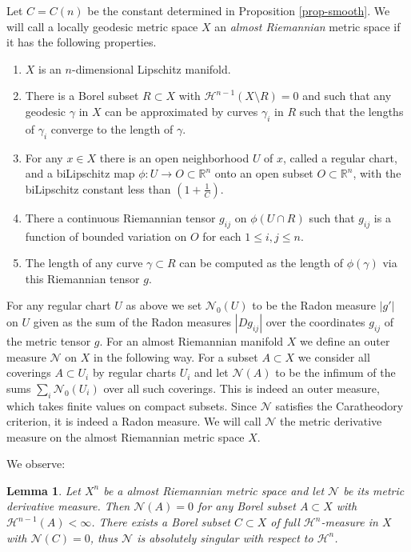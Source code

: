\documentclass[12pt,leqno]{amsart}
\numberwithin{equation}{section}
\newtheorem{lem}[thm]{Lemma}
\theoremstyle{definition}
\theoremstyle{remark}
\newcommand{\R}{\mathbb{R}}
\begin{document}
 Let  $C =C(n)$ be the constant determined in  Proposition \ref{prop-smooth}. We will call  a locally geodesic metric space
 $X$ an \emph{almost Riemannian} metric space  if it has the following properties.
 \begin{enumerate}
 \item  $X$ is an $n$-dimensional Lipschitz manifold.
 \item  There is   a Borel subset $R\subset X$ with $\mathcal H^{n-1} (X\setminus R)=0$ and such that  any geodesic
 $\gamma$ in $X$ can be approximated by curves $\gamma _i$ in $R$ such that the lengths of $\gamma _i$ converge to the length of  $\gamma$.
\item For any  $x\in X$ there is an  open neighborhood $U$ of $x$, called a regular chart, and  a biLipschitz map
$\phi:U\to O\subset \R^n$ onto an open subset $O\subset \R^n$, with the biLipschitz constant less than $(1+\frac 1 C)$.
 \item There a continuous Riemannian tensor $g_{ij} $ on $\phi (U\cap R)$ such that $g_{ij}$ is a  function of bounded variation on $O$
for each $1\leq i,j \leq n$.
 \item The length of any curve $\gamma \subset R$ can be computed as the length of $\phi (\gamma )$ via this Riemannian tensor $g$.
\end{enumerate}

For any regular chart $U$ as above we set $\mathcal N_0 (U)$ to be the Radon measure $|g'|$ on $U$ given as the sum of
the Radon measures $|D g_{ij}|$ over the coordinates $ g_{ij}$ of the metric tensor $g$.
For an almost Riemannian manifold $X$ we define an outer measure $\mathcal N$ on $X$  in the following way.
For a subset $A\subset X$ we consider all  coverings $A\subset U_i$ by regular charts $U_i$ and let $\mathcal N(A)$
to be the infimum of the sums $\sum_i \mathcal N_0 (U_i)$  over all such coverings.  This is indeed an outer measure, which takes finite values on compact subsets.  Since $\mathcal N$  satisfies the Caratheodory criterion, it is indeed a Radon measure.  We will call $\mathcal N$ the metric derivative measure on the almost Riemannian metric space $X$.


We observe:
\begin{lem}
Let $X^n$ be a almost Riemannian metric space and let $\mathcal N$ be its metric derivative measure.
Then $\mathcal N (A)=0$ for any Borel subset $A\subset X$ with $\mathcal H^{n-1} (A)<\infty$.
There exists a Borel subset $C\subset X$ of full $\mathcal H^n$-measure in $X$ with
$\mathcal N(C)=0$, thus $\mathcal N$ is absolutely singular with respect to $\mathcal H^n$.
\end{lem}
\end{document}
